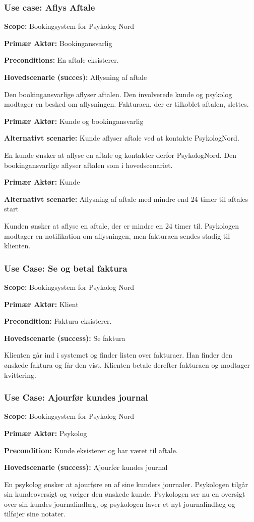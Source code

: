 \subsubsection{Use case: Aflys Aftale}
{\setlength{\parindent}{0cm}
\textbf{Scope:} Bookingsystem for Psykolog Nord

\textbf{Primær Aktør:} Bookingansvarlig

\textbf{Preconditions:} En aftale eksisterer.

\textbf{Hovedscenarie (succes):} Aflysning af aftale

Den bookingansvarlige aflyser aftalen.
Den involverede kunde og psykolog modtager en besked om aflysningen. Fakturaen, der er tilkoblet aftalen, slettes.

\textbf{Primær Aktør:} Kunde og bookingansvarlig

\textbf{Alternativt scenarie:} Kunde aflyser aftale ved at kontakte PsykologNord.

En kunde ønsker at aflyse en aftale og kontakter derfor PsykologNord.
Den bookingansvarlige aflyser aftalen som i hovedscenariet.

\textbf{Primær Aktør:} Kunde

\textbf{Alternativt scenarie:} Aflysning af aftale med mindre end 24 timer til aftales start

Kunden ønsker at aflyse en aftale, der er mindre en 24 timer til.
Psykologen modtager en notifikation om aflysningen, men fakturaen sendes stadig til klienten.
}

\subsubsection{Use Case: Se og betal faktura}
{\setlength{\parindent}{0cm}
\textbf{Scope:} Bookingsystem for Psykolog Nord

\textbf{Primær Aktør:} Klient

\textbf{Precondition:} Faktura eksisterer.

\textbf{Hovedscenarie (success):} Se faktura

Klienten går ind i systemet og finder listen over fakturaer. 
Han finder den ønskede faktura og får den vist. Klienten betale derefter fakturaen og modtager kvittering.
}

\subsubsection{Use Case: Ajourfør kundes journal}
{\setlength{\parindent}{0cm}
\textbf{Scope:} Bookingsystem for Psykolog Nord

\textbf{Primær Aktør:} Psykolog

\textbf{Precondition:} Kunde eksisterer og har været til aftale.

\textbf{Hovedscenarie (success):} Ajourfør kundes journal

En psykolog ønsker at ajourføre en af sine kunders journaler.
Psykologen tilgår sin kundeoversigt og vælger den ønskede kunde.
Psykologen ser nu en oversigt over sin kundes journalindlæg, og psykologen laver et nyt journalindlæg og tilføjer sine notater.
}
